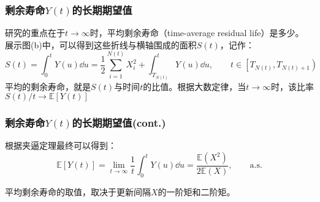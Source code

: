 \documentclass[t]{beamer}
\newcommand{\E}{\mathbb{E}}
\begin{document}
\begin{frame}
  \frametitle{剩余寿命$Y(t)$的长期期望值}
  研究的重点在于$t\to \infty$时，平均剩余寿命（time-average residual life）是多少。
  展示图(b)中，可以得到这些折线与横轴围成的面积$S(t)$，记作：
  \[S(t) = \int^t_0 Y(u)\dd u = \frac{1}{2}\sum^{N(t)}_{i=1}X^2_i+\int^t_{T_{N(t)}}Y(u)\dd u,\qquad t\in \left[T_{N(t)}, T_{N(t)+1}\right)\]
  平均的剩余寿命，就是$S(t)$与时间$t$的比值。根据大数定律，当$t\to\infty$时，该比率$S(t)/t\to \E[Y(t)]$

\end{frame}


\begin{frame}
  \frametitle{剩余寿命$Y(t)$的长期期望值(cont.)}
  根据夹逼定理最终可以得到：
  \begin{equation*}
    \E[Y(t)]= \lim_{t\to\infty} \frac{1}{t}\int^t_0 Y(u)\dd u=\frac{\E(X^2)}{2\E(X)},\qquad \text{a.s.}
 \end{equation*}

 平均剩余寿命的取值，取决于更新间隔$X$的一阶矩和二阶矩。
  

\end{frame}
\end{document}

